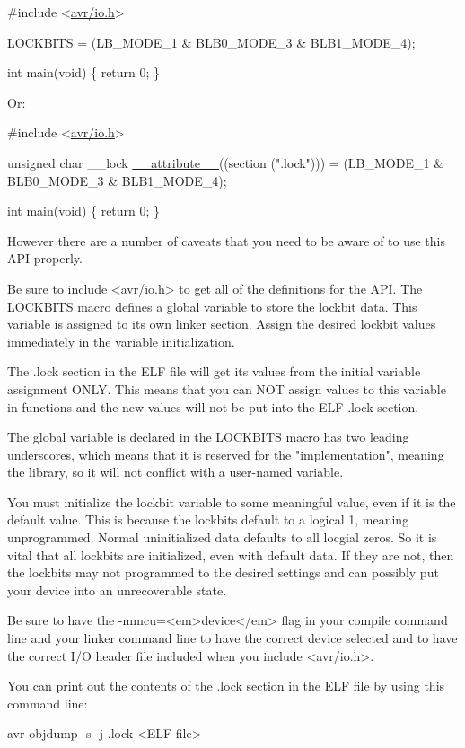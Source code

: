 \begin{DoxyCode}
\textcolor{preprocessor}{#include <\hyperlink{io_8h}{avr/io.h}>}

LOCKBITS = (LB\_MODE\_1 & BLB0\_MODE\_3 & BLB1\_MODE\_4);

\textcolor{keywordtype}{int} main(\textcolor{keywordtype}{void})
\{
    \textcolor{keywordflow}{return} 0;
\}
\end{DoxyCode}


Or\+:


\begin{DoxyCode}
\textcolor{preprocessor}{#include <\hyperlink{io_8h}{avr/io.h}>}

\textcolor{keywordtype}{unsigned} \textcolor{keywordtype}{char} \_\_lock \hyperlink{stdint_8h_a772744ca0816d59e120b8f8a1ede64f0}{\_\_attribute\_\_}((section (\textcolor{stringliteral}{".lock"}))) = 
    (LB\_MODE\_1 & BLB0\_MODE\_3 & BLB1\_MODE\_4);

\textcolor{keywordtype}{int} main(\textcolor{keywordtype}{void})
\{
    \textcolor{keywordflow}{return} 0;
\}
\end{DoxyCode}


\begin{DoxyVerb}However there are a number of caveats that you need to be aware of to
use this API properly.

Be sure to include <avr/io.h> to get all of the definitions for the API.
The LOCKBITS macro defines a global variable to store the lockbit data. This 
variable is assigned to its own linker section. Assign the desired lockbit 
values immediately in the variable initialization.

The .lock section in the ELF file will get its values from the initial 
variable assignment ONLY. This means that you can NOT assign values to 
this variable in functions and the new values will not be put into the
ELF .lock section.

The global variable is declared in the LOCKBITS macro has two leading 
underscores, which means that it is reserved for the "implementation",
meaning the library, so it will not conflict with a user-named variable.

You must initialize the lockbit variable to some meaningful value, even
if it is the default value. This is because the lockbits default to a 
logical 1, meaning unprogrammed. Normal uninitialized data defaults to all 
locgial zeros. So it is vital that all lockbits are initialized, even with 
default data. If they are not, then the lockbits may not programmed to the 
desired settings and can possibly put your device into an unrecoverable 
state.

Be sure to have the -mmcu=<em>device</em> flag in your compile command line and
your linker command line to have the correct device selected and to have 
the correct I/O header file included when you include <avr/io.h>.

You can print out the contents of the .lock section in the ELF file by
using this command line:
\end{DoxyVerb}
 
\begin{DoxyCode}
avr-objdump -s -j .lock <ELF file>
\end{DoxyCode}
 